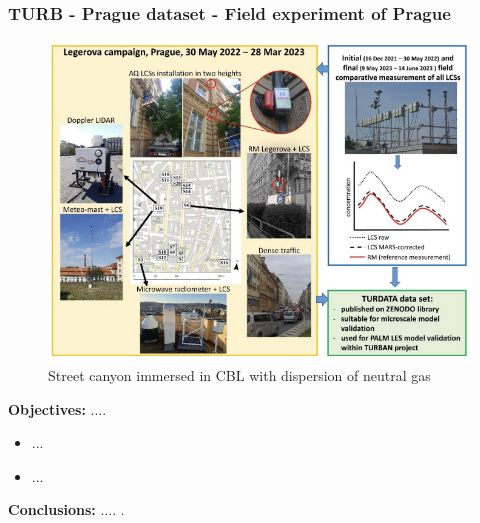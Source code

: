 \subsubsection{TURB - Prague dataset - Field experiment of Prague}
    \begin{figure}[h!]
        \hypertarget{link:turb_p}{}
        \centering
        \includegraphics[scale=0.7]{imgs/turban_dataset_image.png}
        \caption{Street canyon immersed in CBL with dispersion of neutral 
        gas}
    \end{figure}
    \textbf{Objectives:} ....\newline
    \begin{itemize}
        \item ...
        \item ...
    \end{itemize}
    \textbf{Conclusions:} .... .\newline

